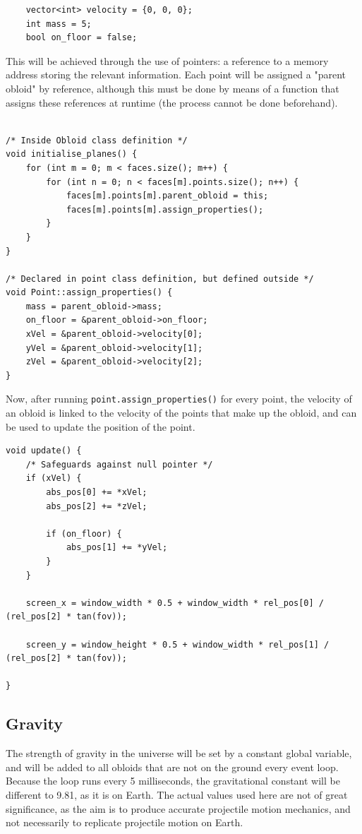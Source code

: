 \documentclass{article}
\begin{document}
\begin{lstlisting}
	vector<int> velocity = {0, 0, 0};
	int mass = 5;
	bool on_floor = false;
\end{lstlisting}
This will be achieved through the use of pointers: a reference to a memory address storing the relevant information. Each point will be assigned a "parent obloid" by reference, although this must be done by means of a function that assigns these references at runtime (the process cannot be done beforehand).

\begin{lstlisting}

/* Inside Obloid class definition */
void initialise_planes() {
	for (int m = 0; m < faces.size(); m++) {
		for (int n = 0; n < faces[m].points.size(); n++) {
			faces[m].points[m].parent_obloid = this;
			faces[m].points[m].assign_properties();
		}
	}
}

/* Declared in point class definition, but defined outside */
void Point::assign_properties() {
	mass = parent_obloid->mass;
	on_floor = &parent_obloid->on_floor;
	xVel = &parent_obloid->velocity[0];
	yVel = &parent_obloid->velocity[1];
	zVel = &parent_obloid->velocity[2];
}
\end{lstlisting}
Now, after running \verb|point.assign_properties()| for every point, the velocity of an obloid is linked to the velocity of the points that make up the obloid, and can be used to update the position of the point.
\newline
\newline
\newline
\begin{lstlisting}
void update() {
	/* Safeguards against null pointer */
	if (xVel) {
		abs_pos[0] += *xVel;
		abs_pos[2] += *zVel;

		if (on_floor) {
			abs_pos[1] += *yVel;
		}
	}

	screen_x = window_width * 0.5 + window_width * rel_pos[0] / (rel_pos[2] * tan(fov));

	screen_y = window_height * 0.5 + window_width * rel_pos[1] / (rel_pos[2] * tan(fov));	

}
\end{lstlisting}
\subsection{Gravity}
The strength of gravity in the universe will be set by a constant global variable, and will be added to all obloids that are not on the ground every event loop. Because the loop runs every 5 milliseconds, the gravitational constant will be different to 9.81, as it is on Earth. 
\newline
\newline
The actual values used here are not of great significance, as the aim is to produce accurate projectile motion mechanics, and not necessarily to replicate projectile motion on Earth.
\end{document}
